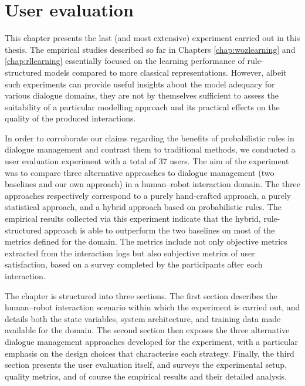 \chapter{User evaluation}
\label{chap:user-evaluation}

This chapter presents the last (and most extensive) experiment carried out in this thesis. The empirical studies described so far in Chapters \ref{chap:wozlearning} and \ref{chap:rllearning} essentially focused on the learning performance of rule-structured models compared to more classical representations. However, albeit such experiments can provide useful insights about the model adequacy for various dialogue domains, they are not by themselves sufficient to assess the suitability of a particular modelling approach and its practical effects on the quality of the produced interactions. 

In order to corroborate our claims regarding the benefits of probabilistic rules in dialogue management and contrast them to traditional methods, we conducted a user evaluation experiment with a total of 37 users. The aim of the experiment was to compare three alternative approaches to dialogue management (two baselines and our own approach) in a human--robot interaction domain.  The three approaches respectively correspond to a purely hand-crafted approach, a purely statistical approach, and a hybrid approach based on probabilistic rules. The empirical results collected via this experiment indicate that the  hybrid, rule-structured approach is able to outperform the two baselines on most of the metrics defined for the domain.  The metrics include not only objective metrics extracted from the interaction logs but also subjective metrics of user satisfaction, based on a survey completed by the participants after each interaction. 


The chapter is structured into three sections.  The first section describes the human--robot interaction scenario within which the experiment is carried out, and details both the state variables, system architecture, and training data made available for the domain. The second section then exposes the three alternative dialogue management approaches developed for the experiment, with a particular emphasis on the design choices that characterise each strategy.   Finally, the third section presents the user evaluation itself, and surveys the experimental setup, quality metrics, and of course the empirical results and their detailed analysis. 

